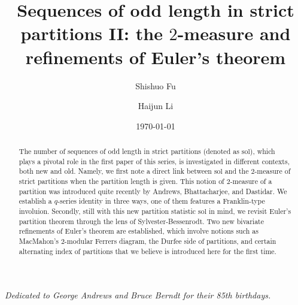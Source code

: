 \documentclass[11pt,reqno]{amsart}
\numberwithin{equation}{section}
\theoremstyle{plain}
\theoremstyle{definition}
\theoremstyle{named}
\def\sol{\mathrm{sol}}
\begin{document}
\title[SOL in strict partitions II: the $2$-measure and refinements of Euler's theorem]{Sequences of odd length in strict partitions II: the $2$-measure and refinements of Euler's theorem}

\author[S. Fu]{Shishuo Fu}
\address[Shishuo Fu]{College of Mathematics and Statistics, Chongqing University, Chongqing 401331, P.R. China}

\author[H. Li]{Haijun Li}
\address[Haijun Li]{College of Mathematics and Statistics, Chongqing University, Chongqing 401331, P.R. China}

\date{\today}

\begin{abstract}
The number of sequences of odd length in strict partitions (denoted as $\sol$), which plays a pivotal role in the first paper of this series, is investigated in different contexts, both new and old. Namely, we first note a direct link between $\sol$ and the $2$-measure of strict partitions when the partition length is given. This notion of $2$-measure of a partition was introduced quite recently by Andrews, Bhattacharjee, and Dastidar. We establish a $q$-series identity in three ways, one of them features a Franklin-type involuion. Secondly, still with this new partition statistic $\sol$ in mind, we revisit Euler's partition theorem through the lens of Sylvester-Bessenrodt. Two new bivariate refinements of Euler's theorem are established, which involve notions such as MacMahon's 2-modular Ferrers diagram, the Durfee side of partitions, and certain alternating index of partitions that we believe is introduced here for the first time.
\end{abstract}




\maketitle

\begin{flushright}
{\noindent\footnotesize\itshape Dedicated to George Andrews and Bruce Berndt for their 85th birthdays.}
\end{flushright}

\bigskip\bigskip
\end{document}
